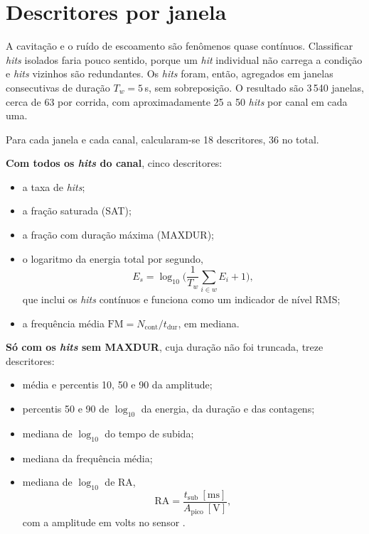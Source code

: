 \documentclass[12pt]{article}
\begin{document}
\section{Descritores por janela}
\label{sec:descritores}

A cavitação e o ruído de escoamento são fenômenos quase contínuos. Classificar \textit{hits} isolados faria pouco sentido, porque um \textit{hit} individual não carrega a condição e \textit{hits} vizinhos são redundantes. Os \textit{hits} foram, então, agregados em janelas consecutivas de duração \(T_w = 5\)\,s, sem sobreposição. O resultado são 3\,540 janelas, cerca de 63 por corrida, com aproximadamente 25 a 50 \textit{hits} por canal em cada uma.

Para cada janela e cada canal, calcularam-se 18 descritores, 36 no total.

\textbf{Com todos os \textit{hits} do canal}, cinco descritores:
\begin{itemize}
	\item a taxa de \textit{hits};
	\item a fração saturada (SAT);
	\item a fração com duração máxima (MAXDUR);
	\item o logaritmo da energia total por segundo,
	\begin{equation}
		E_s = \log_{10}\!\Big(\frac{1}{T_w}\sum_{i\in w} E_i + 1\Big),
		\label{eq:energia_s}
	\end{equation}
	que inclui os \textit{hits} contínuos e funciona como um indicador de nível RMS;
	\item a frequência média \(\mathrm{FM} = N_{\mathrm{cont}}/t_{\mathrm{dur}}\), em mediana.
\end{itemize}

\textbf{Só com os \textit{hits} sem MAXDUR}, cuja duração não foi truncada, treze descritores:
\begin{itemize}
	\item média e percentis 10, 50 e 90 da amplitude;
	\item percentis 50 e 90 de \(\log_{10}\) da energia, da duração e das contagens;
	\item mediana de \(\log_{10}\) do tempo de subida;
	\item mediana da frequência média;
	\item mediana de \(\log_{10}\) de RA,
	\begin{equation}
		\mathrm{RA} = \frac{t_{\mathrm{sub}}\ [\mathrm{ms}]}{A_{\mathrm{pico}}\ [\mathrm{V}]},
		\label{eq:ra}
	\end{equation}
	com a amplitude em volts no sensor \cite{ohno2010}.
\end{itemize}
\end{document}
